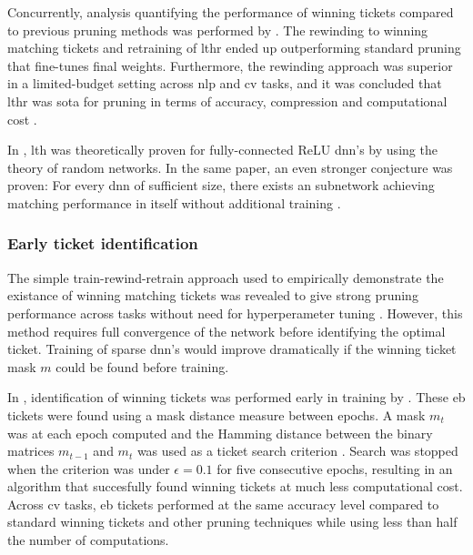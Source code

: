 \documentclass[12pt,fleqn,twocolumn]{article}
\begin{document}
Concurrently, analysis quantifying the performance of winning tickets compared to previous pruning methods was performed by \textcite{Renda2020ComparingRA}.
The rewinding to winning matching tickets and retraining of \acrshort{lthr} ended up outperforming standard pruning that fine-tunes final weights.
Furthermore, the rewinding approach was superior in a limited-budget setting across \acrfull{nlp} and \acrfull{cv} tasks, and it was concluded that \acrshort{lthr} was \acrfull{sota} for pruning in terms of accuracy, compression and computational cost \cite[Chap. 6]{Renda2020ComparingRA} \cite{lange2020lth}.

In \citeyear{Malach2020ProvingTL}, \acrshort{lth} was theoretically proven for fully-connected ReLU \acrshort{dnn}'s by \textcite{Malach2020ProvingTL} using the theory of random networks.
In the same paper, an even stronger conjecture was proven:
For every \acrshort{dnn} of sufficient size, there exists an subnetwork achieving matching performance in itself without additional training \cite[Theorem 2.1]{Malach2020ProvingTL}.

\subsubsection*{Early ticket identification}
The simple train-rewind-retrain approach used to empirically demonstrate the existance of winning matching tickets was revealed to give strong pruning performance across tasks without need for hyperperameter tuning \cite[Chap. 6]{Renda2020ComparingRA}.
However, this method requires full convergence of the network before identifying the optimal ticket.
Training of sparse \acrshort{dnn}'s would improve dramatically if the winning ticket mask $m$ could be found before training.

In \citeyear{You2020DrawingET}, identification of winning tickets was performed early in training by \textcite{You2020DrawingET}.
These \acrfull{eb} tickets were found using a mask distance measure between epochs.
A mask $m_t$ was at each epoch computed and the Hamming distance between the binary matrices $m_{t-1}$ and $m_{t}$ was used as a ticket search criterion \cite[Chap. 3.3]{You2020DrawingET}.
Search was stopped when the criterion was under $\epsilon = 0.1$ for five consecutive epochs, resulting in an algorithm that succesfully found winning tickets at much less computational cost.
Across \acrshort{cv} tasks, \acrshort{eb} tickets performed at the same accuracy level compared to standard winning tickets and other pruning techniques while using less than half the number of computations.
\end{document}
